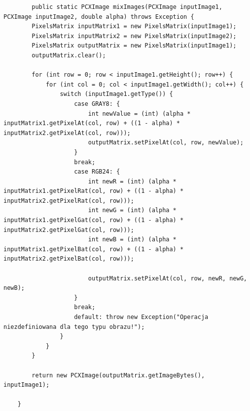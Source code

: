 \documentclass{article}
\begin{document}
	\begin{verbatim}
	    public static PCXImage mixImages(PCXImage inputImage1, PCXImage inputImage2, double alpha) throws Exception {
        PixelsMatrix inputMatrix1 = new PixelsMatrix(inputImage1);
        PixelsMatrix inputMatrix2 = new PixelsMatrix(inputImage2);
        PixelsMatrix outputMatrix = new PixelsMatrix(inputImage1);
        outputMatrix.clear();

        for (int row = 0; row < inputImage1.getHeight(); row++) {
            for (int col = 0; col < inputImage1.getWidth(); col++) {
                switch (inputImage1.getType()) {
                    case GRAY8: {
                        int newValue = (int) (alpha * inputMatrix1.getPixelAt(col, row) + ((1 - alpha) * inputMatrix2.getPixelAt(col, row)));
                        outputMatrix.setPixelAt(col, row, newValue);
                    }
                    break;
                    case RGB24: {
                        int newR = (int) (alpha * inputMatrix1.getPixelRat(col, row) + ((1 - alpha) * inputMatrix2.getPixelRat(col, row)));
                        int newG = (int) (alpha * inputMatrix1.getPixelGat(col, row) + ((1 - alpha) * inputMatrix2.getPixelGat(col, row)));
                        int newB = (int) (alpha * inputMatrix1.getPixelBat(col, row) + ((1 - alpha) * inputMatrix2.getPixelBat(col, row)));

                        outputMatrix.setPixelAt(col, row, newR, newG, newB);
                    }
                    break;
                    default: throw new Exception("Operacja niezdefiniowana dla tego typu obrazu!");
                }
            }
        }

        return new PCXImage(outputMatrix.getImageBytes(), inputImage1);

    }
	\end{verbatim}
	
\end{document}
